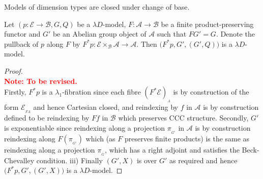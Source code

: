 \documentclass[a4paper,UKenglish]{lipics}
\newcommand\note[1]{{ \bf \textcolor{red} {\vspace{2mm}\; \\ Note: #1\\}}}
\newcommand{\LamOneFib}{$\lambda_1$-fibration\xspace}
\newcommand{\ra}{\rightarrow}
\newcommand{\A}{\mathcal{A}}
\newcommand{\B}{\mathcal{B}}
\newcommand{\E}{\mathcal{E}}
\newcommand{\fibre}[2]{#1_{_{#2}}}
\newcommand{\fibreE}[1]{\E_{_{#1}}}
\newcommand{\blank}{\, \underline{\hspace{2mm}} \,}
\newcommand{\bbracket}[1]{\bigl( #1 \bigr)}
\begin{document}
%

Models of dimension types are closed under change of base.
\begin{theorem}
Let $(p: \E \ra \B, G, Q)$ be a $\lambda D$-model, $F:\A \ra \B$ be a finite product-preserving functor and $G'$ be an Abelian group object of $\A$ such that $FG' = G$.  Denote the pullback of $p$ along $F$ by $F^\ast p : \E\times_\B\A \rightarrow \A$. Then $\bbracket{F^{\ast}p, G', (G',Q)}$ is a $\lambda D$-model.
\end{theorem}

\begin{proof}\note{To be revised.}
Firstly, $F^*p$ is a \LamOneFib since each fibre $\fibre{(F^*\E)}{A}$ is by construction of the form $\fibreE{FA}$ and hence Cartesian closed, and  reindexing by $f$ in $\A$ is by construction defined to be reindexing by $Ff$ in $\B$ which preserves CCC structure. Secondly, $G'$ is exponentiable since reindexing along a projection $\pi_{_{G'}}$ in $\A$ is by construction reindexing along $F(\pi_{_{G'}})$ which (as $F$ preserves finite products) is the same as reindexing along a projection $\pi_{_{G}}$, which has a right adjoint and satisfies the Beck-Chevalley condition. iii) Finally $(G', X)$ is over $G'$ as required and hence $\bbracket{F^{\ast}p, G', (G',X)}$ is a $\lambda D$-model.
\end{proof}
\end{document}
